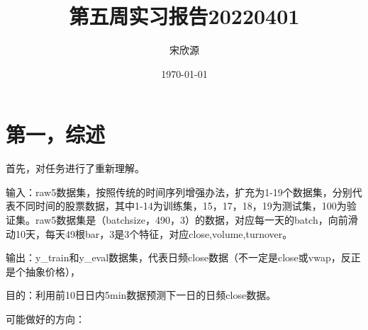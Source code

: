\documentclass[11pt]{ctexart}
\begin{document}
\title{第五周实习报告20220401}
\author{宋欣源}
\date{\today}

\maketitle %


\section{第一，综述}

首先，对任务进行了重新理解。

输入：raw5数据集，按照传统的时间序列增强办法，扩充为1-19个数据集，分别代表不同时间的股票数据，其中1-14为训练集，15，17，18，19为测试集，100为验证集。raw5数据集是（batchsize，490，3）的数据，对应每一天的batch，向前滑动10天，每天49根bar，3是3个特征，对应close,volume,turnover。

输出：y\_train和y\_eval数据集，代表日频close数据（不一定是close或vwap，反正是个抽象价格），

目的：利用前10日日内5min数据预测下一日的日频close数据。

可能做好的方向：
\end{document}
